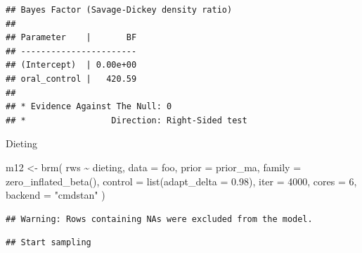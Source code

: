 \documentclass[
]{article}
\newenvironment{Shaded}{\begin{snugshade}}{\end{snugshade}}
\newcommand{\AttributeTok}[1]{\textcolor[rgb]{0.77,0.63,0.00}{#1}}
\newcommand{\DecValTok}[1]{\textcolor[rgb]{0.00,0.00,0.81}{#1}}
\newcommand{\FloatTok}[1]{\textcolor[rgb]{0.00,0.00,0.81}{#1}}
\newcommand{\FunctionTok}[1]{\textcolor[rgb]{0.00,0.00,0.00}{#1}}
\newcommand{\NormalTok}[1]{#1}
\newcommand{\OtherTok}[1]{\textcolor[rgb]{0.56,0.35,0.01}{#1}}
\newcommand{\SpecialCharTok}[1]{\textcolor[rgb]{0.00,0.00,0.00}{#1}}
\newcommand{\StringTok}[1]{\textcolor[rgb]{0.31,0.60,0.02}{#1}}
\begin{document}
\begin{verbatim}
## Bayes Factor (Savage-Dickey density ratio)
## 
## Parameter    |       BF
## -----------------------
## (Intercept)  | 0.00e+00
## oral_control |   420.59
## 
## * Evidence Against The Null: 0
## *                 Direction: Right-Sided test
\end{verbatim}

Dieting

\begin{Shaded}
\begin{Highlighting}[]
\NormalTok{m12 }\OtherTok{\textless{}{-}} \FunctionTok{brm}\NormalTok{(}
\NormalTok{  rws }\SpecialCharTok{\textasciitilde{}}\NormalTok{ dieting,}
  \AttributeTok{data =}\NormalTok{ foo, }
  \AttributeTok{prior =}\NormalTok{ prior\_ma,}
  \AttributeTok{family =} \FunctionTok{zero\_inflated\_beta}\NormalTok{(),}
  \AttributeTok{control =} \FunctionTok{list}\NormalTok{(}\AttributeTok{adapt\_delta =} \FloatTok{0.98}\NormalTok{),}
  \AttributeTok{iter =} \DecValTok{4000}\NormalTok{,}
  \AttributeTok{cores =} \DecValTok{6}\NormalTok{,}
  \AttributeTok{backend =} \StringTok{"cmdstan"}
\NormalTok{)}
\end{Highlighting}
\end{Shaded}

\begin{verbatim}
## Warning: Rows containing NAs were excluded from the model.
\end{verbatim}

\begin{verbatim}
## Start sampling
\end{verbatim}
\end{document}
